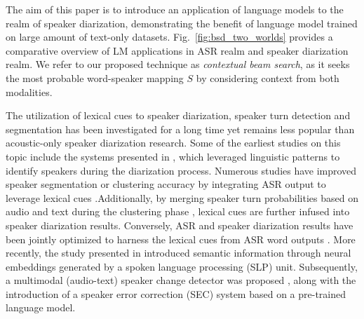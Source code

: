 \documentclass{article}
\begin{document}
The aim of this paper is to introduce an application of language models to the realm of speaker diarization, demonstrating the benefit of language model trained on large amount of text-only datasets. Fig.~\ref{fig:bsd_two_worlds} provides a comparative overview of LM applications in ASR realm and speaker diarization realm. We refer to our proposed technique as \textit{contextual beam search}, as it seeks the most probable word-speaker mapping $S$ by considering context from both modalities.

The utilization of lexical cues to speaker diarization, speaker turn detection and segmentation has been investigated for a long time yet remains less popular than acoustic-only speaker diarization research. Some of the earliest studies on this topic include the systems presented in \cite{canseco2004speaker,canseco2005comparative}, which leveraged linguistic patterns to identify speakers during the diarization process. Numerous studies have improved speaker segmentation or clustering accuracy by integrating ASR output to leverage lexical cues \cite{park2018multimodal, xia2022turn, khare2022asr}.\;Additionally, by merging speaker turn probabilities based on audio and text during the clustering phase \cite{park2020speaker}, lexical cues are further infused into speaker diarization results. Conversely, ASR and speaker diarization results have been jointly optimized to harness the lexical cues from ASR word outputs \cite{shafey2019joint, kanda2022transcribe}. More recently, the study presented in \cite{cheng2023exploring} introduced semantic information through neural embeddings generated by a spoken language processing (SLP) unit. Subsequently, a multimodal (audio-text) speaker change detector was proposed \cite{jung2023encoder}, along with the introduction of a speaker error correction (SEC) system \cite{paturi2023lexical} based on a pre-trained language model.
\end{document}
